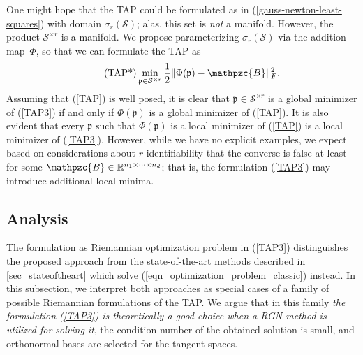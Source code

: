 \documentclass[a4paper,10pt,final]{siamart1116}
\newcommand{\tuple}[1]{\mathfrak{#1}}
\newcommand{\Var}[1]{\mathcal{#1}}
\newcommand{\Sec}[2]{\sigma_{#1}(#2)}
\newcommand{\tensor}[1]{\mathpzc{#1}}
\newcommand{\R}{\mathbb{R}}
\newcommand{\refeqn}[1]{{(\ref{#1})}}
\numberwithin{equation}{section}
\numberwithin{figure}{section}
\numberwithin{table}{section}
\numberwithin{theorem}{section}
\begin{document}
One might hope that the TAP could be formulated as in \refeqn{gauss-newton-least-squares} with domain $\Sec{r}{\Var{S}}$; alas, this set is \emph{not} a manifold. However, the product $\Var{S}^{\times r}$ is a manifold.
We propose parameterizing $\sigma_r(\Var{S})$ via the addition map~$\Phi$, so that we can formulate the TAP as
\begin{equation}\tag{TAP*}\label{TAP3}
 \min_{\tuple{p}\in\Var{S}^{\times r}} \frac{1}{2} \| \Phi(\tuple{p}) - \tensor{B} \|_F^2.
\end{equation}
Assuming that \refeqn{TAP} is well posed, it is clear that $\tuple{p} \in \Var{S}^{\times r}$ is a global minimizer of \refeqn{TAP3} if and only if $\Phi(\tuple{p})$ is a global minimizer of \refeqn{TAP}.
It is also evident that every $\tuple{p}$ such that $\Phi(\tuple{p})$ is a local minimizer of \refeqn{TAP} is a local minimizer of \refeqn{TAP3}. However, while we have no explicit examples, we expect based on considerations about $r$-identifiability that the converse is false at least for some $\tensor{B} \in \R^{n_1 \times \cdots \times n_d}$; that is, the formulation \refeqn{TAP3} may introduce additional local minima.


\subsection{Analysis}\label{sec_tap_analysis}
The formulation as Riemannian optimization problem in \refeqn{TAP3} distinguishes the proposed approach from the state-of-the-art methods described in \cref{sec_stateoftheart} which solve \refeqn{eqn_optimization_problem_classic} instead.
In this subsection, we interpret both approaches as special cases of a family of possible Riemannian formulations of the TAP. We argue that in this family \emph{the formulation \refeqn{TAP3} is theoretically a good choice when a RGN method is utilized for solving it}, the condition number of the obtained solution is small, and orthonormal bases are selected for the tangent spaces.
\end{document}

